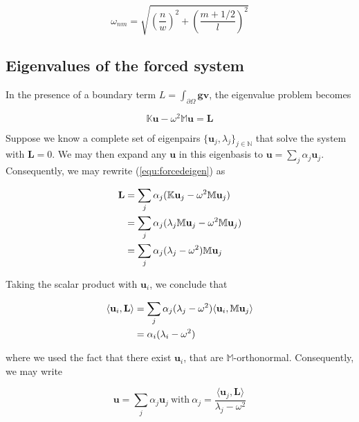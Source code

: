 \documentclass[11pt, a4paper]{article}
\begin{document}
\begin{equation}
    \omega_{nm} = \sqrt{\left(\frac{n}{w}\right)^2 + \left(\frac{m+1/2}{l}\right)^2}
\end{equation}

\subsection{Eigenvalues of the forced system}
\label{subsec:eigenvalues}

In the presence of a boundary term $L = \int_{\partial \Omega} \mathbf{g} \mathbf{v}$,
the eigenvalue problem becomes

\begin{equation}
    \mathbb{K} \mathbf{u} - \omega^2 \mathbb{M} \mathbf{u}
    = \mathbf{L} \label{equ:forcedeigen}
\end{equation}

Suppose we know a complete set of eigenpairs $\{\mathbf{u}_j, \lambda_j\}_{j \in \mathbb{N}}$
that solve the system with $\mathbf{L}=0$. We may then expand any $\mathbf{u}$ 
in this eigenbasis to $\mathbf{u} = \sum_j \alpha_j \mathbf{u}_j$.
Consequently, we may rewrite (\ref{equ:forcedeigen}) as 

\begin{align}
    \mathbf{L} &= \sum_j \alpha_j (\mathbb{K} \mathbf{u}_j - \omega^2 \mathbb{M} \mathbf{u}_j) \notag \\
      &= \sum_j \alpha_j (\lambda_j \mathbb{M} \mathbf{u}_j - \omega^2 \mathbb{M} \mathbf{u}_j) \notag \\ 
      &= \sum_j \alpha_j (\lambda_j - \omega^2) \mathbb{M} \mathbf{u}_j
\end{align}

Taking the scalar product with $\mathbf{u}_i$, we conclude that 

\begin{align}
    \langle \mathbf{u}_i, \mathbf{L} \rangle
    &= \sum_j \alpha_j (\lambda_j - \omega^2) \langle \mathbf{u}_i, \mathbb{M} \mathbf{u}_j \rangle \notag \\
    &= \alpha_i (\lambda_i - \omega^2) 
\end{align}

where we used the fact that there exist $\mathbf{u}_i$, that are $\mathbb{M}$-orthonormal.
Consequently, we may write

\begin{equation}
    \mathbf{u} = \sum_j \alpha_j \mathbf{u}_j ~\text{with}~\alpha_j = \frac{\langle \mathbf{u}_j, \mathbf{L} \rangle}{\lambda_j - \omega^2}
\end{equation}
\end{document}
